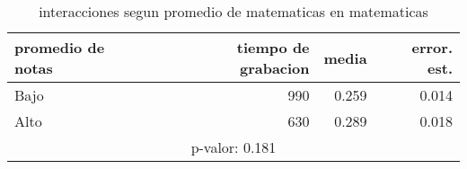 \documentclass[spanish]{article}
\begin{document}
\begin{table}[h!]
\begin{center}
\begin{tabular}{|l|r|r|r|}
\hline
promedio de notas & tiempo de grabacion & media          & error. est.    \\ \hline
Bajo              &                 990 &          0.259 &           0.014\\ \hline
Alto              &                 630 &          0.289 &           0.018\\ \hline
\multicolumn{4}{|c|}{p-valor: 0.181} \\ \hline
\end{tabular}
\caption{interacciones segun promedio de matematicas en matematicas}
\end{center}
\end{table}
\end{document}

